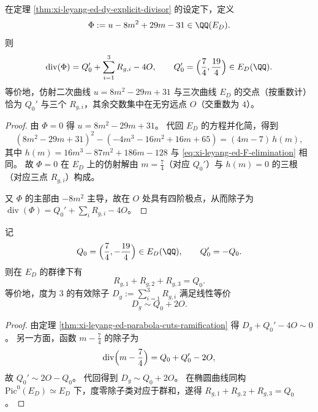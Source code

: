 \begin{theorem}\label{thm:xi-leyang-ed-parabola-cuts-ramification}
在定理 \ref{thm:xi-leyang-ed-dy-explicit-divisor} 的设定下，定义
\[
\Phi:=u-8m^2+29m-31\in\QQ(E_D).
\]
则
\[
\operatorname{div}(\Phi)=Q_0'+\sum_{i=1}^{3}R_{g,i}-4O,
\qquad
Q_0'=\Bigl(\frac74,\frac{19}4\Bigr)\in E_D(\QQ).
\]
等价地，仿射二次曲线 \(u=8m^2-29m+31\) 与三次曲线 \(E_D\) 的交点（按重数计）恰为 \(Q_0'\) 与三个 \(R_{g,i}\)，其余交数集中在无穷远点 \(O\)（交重数为 \(4\)）。
\end{theorem}
\begin{proof}
由 \(\Phi=0\) 得 \(u=8m^2-29m+31\)。
代回 \(E_D\) 的方程并化简，得到
\[
(8m^2-29m+31)^2-(-4m^3-16m^2+16m+65)=(4m-7)\,h(m),
\]
其中 \(h(m)=16m^3-87m^2+186m-128\) 与 \eqref{eq:xi-leyang-ed-F-elimination} 相同。
故 \(\Phi=0\) 在 \(E_D\) 上的仿射解由 \(m=\frac74\)（对应 \(Q_0'\)）与 \(h(m)=0\) 的三根（对应三点 \(R_{g,i}\)）构成。
\par
又 \(\Phi\) 的主部由 \(-8m^2\) 主导，故在 \(O\) 处具有四阶极点，从而除子为
\(\operatorname{div}(\Phi)=Q_0'+\sum_i R_{g,i}-4O\)。
\end{proof}

\begin{corollary}\label{cor:xi-leyang-ed-trace-of-ramification-is-rational}
记
\[
Q_0=\Bigl(\frac74,-\frac{19}4\Bigr)\in E_D(\QQ),
\qquad
Q_0'=-Q_0.
\]
则在 \(E_D\) 的群律下有
\[
R_{g,1}+R_{g,2}+R_{g,3}=Q_0.
\]
等价地，度为 \(3\) 的有效除子 \(D_g:=\sum_{i=1}^3R_{g,i}\) 满足线性等价
\[
D_g\sim Q_0+2O.
\]
\end{corollary}
\begin{proof}
由定理 \ref{thm:xi-leyang-ed-parabola-cuts-ramification} 得
\(
D_g+Q_0'-4O\sim 0
\)。
另一方面，函数 \(m-\frac74\) 的除子为
\[
\operatorname{div}\Bigl(m-\frac74\Bigr)=Q_0+Q_0'-2O,
\]
故 \(Q_0'\sim 2O-Q_0\)。
代回得到 \(D_g\sim Q_0+2O\)。
在椭圆曲线同构 \(\mathrm{Pic}^0(E_D)\simeq E_D\) 下，度零除子类对应于群和，遂得 \(R_{g,1}+R_{g,2}+R_{g,3}=Q_0\)。
\end{proof}

